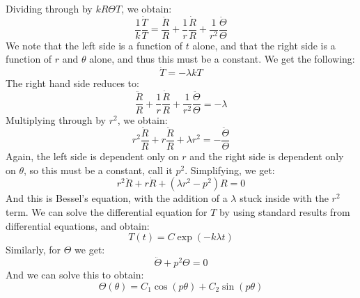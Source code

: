             Dividing through by $kR\Theta{T}$, we obtain:
            \begin{equation}
                \frac{1}{k}\frac{\dot{T}}{T}=
                \frac{\ddot{R}}{R}+\frac{1}{r}\frac{\dot{R}}{R}+
                \frac{1}{r^{2}}\frac{\ddot{\Theta}}{\Theta}
            \end{equation}
            We note that the left side is a function of $t$
            alone, and that the right side is a function of $r$
            and $\theta$ alone, and thus this must be a constant.
            We get the following:
            \begin{equation}
                \dot{T}=\minus\lambda{k}T
            \end{equation}
            The right hand side reduces to:
            \begin{equation}
                \frac{\ddot{R}}{R}+\frac{1}{r}\frac{\dot{R}}{R}+
                \frac{1}{r^{2}}\frac{\ddot{\Theta}}{\Theta}
                =\minus\lambda
            \end{equation}
            Multiplying through by $r^{2}$, we obtain:
            \begin{equation}
                r^{2}\frac{\ddot{R}}{R}+r\frac{\ddot{R}}{R}+
                \lambda{r}^{2}=\minus\frac{\ddot{\Theta}}{\Theta}
            \end{equation}
            Again, the left side is dependent only on $r$ and
            the right side is dependent only on $\theta$, so this
            must be a constant, call it $p^{2}$. Simplifying, we
            get:
            \begin{equation}
                r^{2}\ddot{R}+r\dot{R}+(\lambda{r}^{2}-p^{2})R=0
            \end{equation}
            And this is Bessel's equation, with the addition of
            a $\lambda$ stuck inside with the $r^{2}$ term. We
            can solve the differential equation for $T$ by using
            standard results from differential equations, and obtain:
            \begin{equation}
                T(t)=C\exp(\minus{k}\lambda{t})
            \end{equation}
            Similarly, for $\Theta$ we get:
            \begin{equation}
                \ddot{\Theta}+p^{2}\Theta=0
            \end{equation}
            And we can solve this to obtain:
            \begin{equation}
                \Theta(\theta)=C_{1}\cos(p\theta)+C_{2}\sin(p\theta)
            \end{equation}
